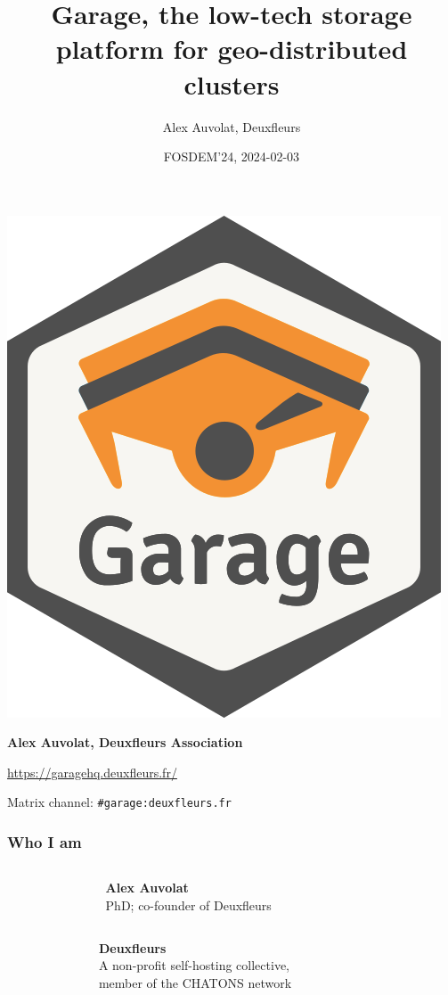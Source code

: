 \documentclass[aspectratio=169]{beamer}
\title{Garage, the low-tech storage platform for geo-distributed clusters}
\author{Alex Auvolat, Deuxfleurs}
\date{FOSDEM'24, 2024-02-03}
\begin{document}
\begin{frame}
	\centering
	\includegraphics[width=.3\linewidth]{../../sticker/Garage.png}
	\vspace{1em}

	{\large\bf Alex Auvolat, Deuxfleurs Association}
	\vspace{1em}

	\url{https://garagehq.deuxfleurs.fr/}

	Matrix channel: \texttt{\#garage:deuxfleurs.fr}
\end{frame}

\begin{frame}
	\frametitle{Who I am}
	\begin{columns}[t]
		\begin{column}{.2\textwidth}
			\centering
		\end{column}
		\begin{column}{.6\textwidth}
			\textbf{Alex Auvolat}\\
			PhD; co-founder of Deuxfleurs
		\end{column}
		\begin{column}{.2\textwidth}
			~
		\end{column}
	\end{columns}
	\vspace{2em}

	\begin{columns}[t]
		\begin{column}{.2\textwidth}
			\centering
		\end{column}
		\begin{column}{.6\textwidth}
			\textbf{Deuxfleurs}\\
			A non-profit self-hosting collective,\\
			member of the CHATONS network
		\end{column}
		\begin{column}{.2\textwidth}
			\centering
		\end{column}
	\end{columns}

\end{frame}
\end{document}
